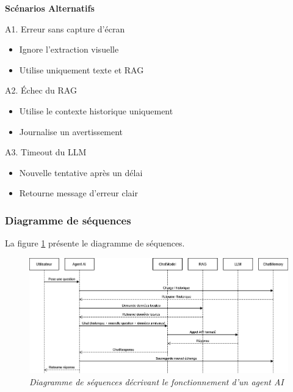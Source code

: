 \documentclass[12pt,a4paper]{report}
\begin{document}
	\textbf{Scénarios Alternatifs}
	
	\begin{description}
		\item{A1. Erreur sans capture d'écran}
		\begin{itemize}
			\item Ignore l'extraction visuelle
			\item Utilise uniquement texte et RAG
		\end{itemize}
		
		\item{A2. Échec du RAG }
		
		\begin{itemize}
			\item Utilise le contexte historique uniquement
			\item Journalise un avertissement
		\end{itemize}
		
		\item{A3. Timeout du LLM} 
		
		\begin{itemize}
			\item Nouvelle tentative après un délai
			\item Retourne message d'erreur clair
		\end{itemize}
	\end{description}
	
	\subsubsection{Diagramme de séquences}
	
	La figure \ref{fig:ds-ai-agent.drawio} présente le diagramme de séquences.
	
	\begin{figure}[H]
		\centering
		\includegraphics[width=1\textwidth]{ds-ai-agent.drawio.png}
		\caption{\textit{Diagramme de séquences décrivant le fonctionnement d'un agent AI}}
		\label{fig:ds-ai-agent.drawio}
	\end{figure}
	
\end{document}

